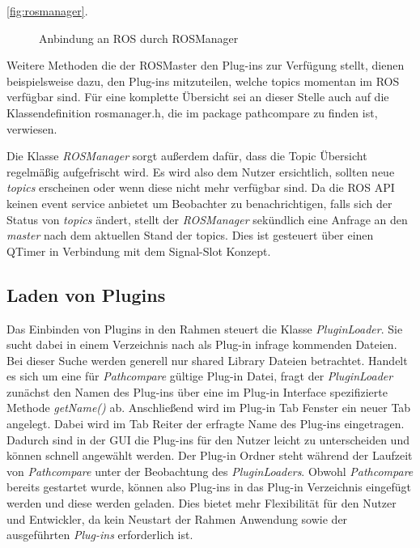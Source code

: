 \autoref{fig:rosmanager}.

\begin{figure}[t]
  \begin{center}
  \end{center}
  \caption{Anbindung an ROS durch ROSManager}
  \label{fig:rosmanager}
\end{figure}

Weitere Methoden die der ROSMaster den Plug-ins zur Verfügung stellt, dienen
beispielsweise dazu, den Plug-ins mitzuteilen, welche topics momentan im ROS
verfügbar sind. Für eine komplette Übersicht sei an dieser Stelle auch auf die
Klassendefinition rosmanager.h, die im package pathcompare zu finden ist,
verwiesen.

Die Klasse \textit{ROSManager} sorgt außerdem dafür, dass die Topic Übersicht
regelmäßig aufgefrischt wird. Es wird also dem Nutzer ersichtlich, sollten neue
\textit{topics} erscheinen oder wenn diese nicht mehr verfügbar sind.  Da die
ROS \gls{API} keinen event service anbietet um Beobachter zu benachrichtigen,
falls sich der Status von \textit{topics} ändert, stellt der
\textit{ROSManager} sekündlich eine Anfrage an den \textit{master} nach dem
aktuellen Stand der topics.  Dies ist gesteuert über einen QTimer in Verbindung
mit dem Signal-Slot Konzept.

\subsection{Laden von Plugins}
Das Einbinden von Plugins in den Rahmen steuert die Klasse
\textit{PluginLoader}. Sie sucht dabei in einem Verzeichnis nach als Plug-in
infrage kommenden Dateien. Bei dieser Suche werden generell nur shared Library
Dateien betrachtet. Handelt es sich um eine für \textit{Pathcompare} gültige
Plug-in Datei, fragt der \textit{PluginLoader} zunächst den Namen des Plug-ins
über eine im Plug-in Interface spezifizierte Methode \textit{getName()} ab.
Anschließend wird im Plug-in Tab Fenster ein neuer Tab angelegt. Dabei wird im
Tab Reiter der erfragte Name des Plug-ins eingetragen. Dadurch sind in der GUI
die Plug-ins für den Nutzer leicht zu unterscheiden und können schnell
angewählt werden.  Der Plug-in Ordner steht während der Laufzeit von
\textit{Pathcompare} unter der Beobachtung des \textit{PluginLoaders}.  Obwohl
\textit{Pathcompare} bereits gestartet wurde, können also Plug-ins in das
Plug-in Verzeichnis eingefügt werden und diese werden geladen. Dies bietet mehr
Flexibilität für den Nutzer und Entwickler, da kein Neustart der Rahmen
Anwendung sowie der ausgeführten \textit{Plug-ins} erforderlich ist.

